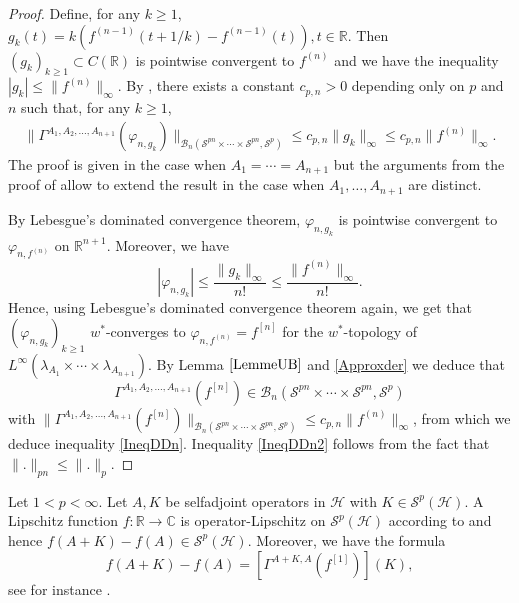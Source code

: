 \documentclass[12pt]{amsart}
\theoremstyle{remark}
\begin{document}
\begin{proof}
Define, for any $k\geq 1$, $g_k(t) = k (f^{(n-1)}(t+1/k) - f^{(n-1)}(t)), t\in \mathbb{R}$. Then $(g_k)_{k\geq 1} \subset C(\mathbb{R})$ is pointwise convergent to $f^{(n)}$ and we have the inequality $|g_k| \leq \|f^{(n)}\|_{\infty}$. By \cite[Theorem 5.3]{PSS-SSF}, there exists a constant $c_{p,n} > 0$ depending only on $p$ and $n$ such that, for any $k\geq 1$,
\begin{align}\label{Approxder}
\| \Gamma^{A_1,A_2, \ldots, A_{n+1}}(\varphi_{n,g_k}) \|_{\mathcal{B}_n(\mathcal{S}^{pn} \times \cdots \times \mathcal{S}^{pn},\mathcal{S}^p)} \leq c_{p,n} \|g_k \|_{\infty} \leq c_{p,n} \|f^{(n)}\|_{\infty}.
\end{align}
The proof is given in the case when $A_1 = \cdots = A_{n+1}$ but the arguments from the proof of \cite[Theorem 2.2]{LMS} allow to extend the result in the case when $A_1, \ldots, A_{n+1}$ are distinct.

By Lebesgue's dominated convergence theorem, $\varphi_{n,g_k}$ is pointwise convergent to $\varphi_{n,f^{(n)}}$ on $\mathbb{R}^{n+1}$. Moreover, we have
$$
|\varphi_{n,g_k}| \leq \dfrac{\|g_k\|_{\infty}}{n!} \leq \dfrac{\|f^{(n)}\|_{\infty}}{n!}.
$$
Hence, using Lebesgue's dominated convergence theorem again, we get that $(\varphi_{n,g_k})_{k\geq 1}$ $w^*$-converges to $\varphi_{n,f^{(n)}} = f^{[n]}$ for the $w^*$-topology of $L^{\infty}(\lambda_{A_1} \times \cdots \times \lambda_{A_{n+1}})$. By Lemma $\ref{LemmeUB}$ and \eqref{Approxder} we deduce that
$$
\Gamma^{A_1,A_2, \ldots, A_{n+1}}(f^{[n]}) \in \mathcal{B}_n(\mathcal{S}^{pn} \times \cdots \times \mathcal{S}^{pn},\mathcal{S}^p)
$$
with $\| \Gamma^{A_1,A_2, \ldots, A_{n+1}}(f^{[n]}) \|_{\mathcal{B}_n(\mathcal{S}^{pn} \times \cdots \times \mathcal{S}^{pn},\mathcal{S}^p)} \leq c_{p,n} \|f^{(n)}\|_{\infty}$, from which we deduce inequality \eqref{IneqDDn}. Inequality \eqref{IneqDDn2} follows from the fact that $\|.\|_{pn} \leq \|.\|_p$.

\end{proof}




Let $1<p<\infty$. Let $A, K$ be selfadjoint operators in $\mathcal{H}$ with $K\in \mathcal{S}^p(\mathcal{H})$. A Lipschitz function $f : \mathbb{R} \to \mathbb{C}$ is operator-Lipschitz on $\mathcal{S}^p(\mathcal{H})$ according to \cite[Theorem 1]{PS-Lipschitz} and hence $f(A+K) - f(A) \in \mathcal{S}^p(\mathcal{H}).$ Moreover, we have the formula
$$
f(A+K) - f(A) = \left[ \Gamma^{A+K,A}(f^{[1]})\right](K),
$$
see for instance \cite[Theorem 7.4]{dPSW}.
\end{document}

